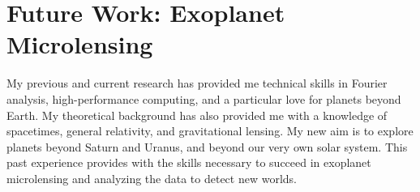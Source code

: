 \documentclass{article}
\begin{document}
    \section{Future Work: Exoplanet Microlensing}
        My previous and current research has provided me technical skills in
        Fourier analysis, high-performance computing, and
        a particular love for planets beyond Earth.
        My theoretical background has also provided me with a knowledge of
        spacetimes, general relativity, and gravitational lensing.
        My new aim is to explore
        planets beyond Saturn and Uranus, and beyond our very own solar system.
        This past
        experience provides with the skills necessary to succeed in exoplanet
        microlensing and analyzing the data to detect new worlds.
    
    
\end{document}
